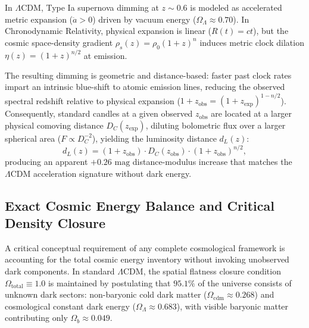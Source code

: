 \documentclass[aps,prd,reprint,superscriptaddress,nofootinbib,floatfix,amsmath,amssymb]{revtex4-2}
\begin{document}
In $\Lambda\text{CDM}$, Type Ia supernova dimming at $z \sim 0.6$ is modeled as accelerated metric expansion ($\ddot{a} > 0$) driven by vacuum energy ($\Omega_\Lambda \approx 0.70$). In Chronodynamic Relativity, physical expansion is linear ($R(t) = c t$), but the cosmic space-density gradient $\rho_s(z) = \rho_0 (1+z)^n$ induces metric clock dilation $\eta(z) = (1+z)^{n/2}$ at emission. 

The resulting dimming is geometric and distance-based: faster past clock rates impart an intrinsic blue-shift to atomic emission lines, reducing the observed spectral redshift relative to physical expansion ($1+z_{\text{obs}} = (1+z_{\text{exp}})^{1 - n/2}$). Consequently, standard candles at a given observed $z_{\text{obs}}$ are located at a larger physical comoving distance $D_C(z_{\text{exp}})$, diluting bolometric flux over a larger spherical area ($F \propto D_C^{-2}$), yielding the luminosity distance $d_L(z)$:
\begin{equation}
d_L(z) = (1+z_{\text{obs}}) \cdot D_C(z_{\text{obs}}) \cdot (1+z_{\text{obs}})^{n/2},
\label{eq:dl_cr}
\end{equation}
producing an apparent $+0.26\text{ mag}$ distance-modulus increase that matches the $\Lambda\text{CDM}$ acceleration signature without dark energy.

\subsection{Exact Cosmic Energy Balance and Critical Density Closure}
\label{subsec:cosmic_energy_budget}

A critical conceptual requirement of any complete cosmological framework is accounting for the total cosmic energy inventory without invoking unobserved dark components. In standard $\Lambda\text{CDM}$, the spatial flatness closure condition $\Omega_{\text{total}} \equiv 1.0$ is maintained by postulating that $95.1\%$ of the universe consists of unknown dark sectors: non-baryonic cold dark matter ($\Omega_{\text{cdm}} \approx 0.268$) and cosmological constant dark energy ($\Omega_\Lambda \approx 0.683$), with visible baryonic matter contributing only $\Omega_b \approx 0.049$.
\end{document}
